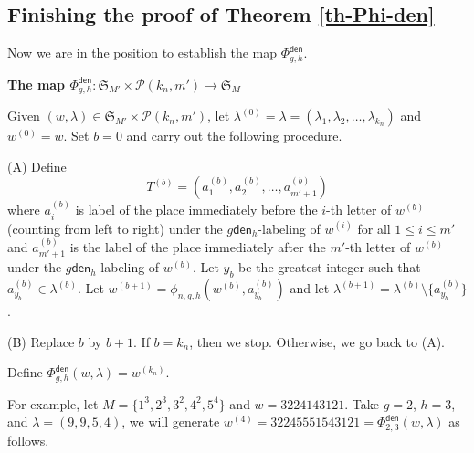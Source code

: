\documentclass[12pt]{article}
\numberwithin{equation}{section}
\theoremstyle{plain}
\def\den{\mathsf{den}}
\begin{document}
 
 
 \subsection{Finishing the proof of Theorem \ref{th-Phi-den}}
 Now we are in  the position to establish the map $\Phi^{\den}_{g,h}$. 
 
  
 
  \begin{framed}
 	\begin{center}
 		{\bf The map $\Phi^{\den}_{g,h}:\mathfrak{S}_{M'}\times \mathcal{P}(k_n, m') \longrightarrow \mathfrak{S}_{M}$ }
 	\end{center}
 	Given  $(w, \lambda)\in \mathfrak{S}_{M'}\times \mathcal{P}(k_n, m')  $, let $\lambda^{(0)}=\lambda=(\lambda_1, \lambda_2, \ldots, \lambda_{k_n})$ and  $w^{(0)}=w$. Set $b=0$ and carry out the following procedure. 
 	 	
 		(A) Define 
 		$$T^{(b)}=(a^{(b)}_{1}, a^{(b)}_2, \ldots,  a^{(b)}_{m'+1})$$ where $a^{(b)}_{i}$  is label of the place immediately before the $i$-th letter of $w^{(b)}$ (counting from left to right) under the $g\den_h$-labeling of $w^{(i)}$ for all $1\leq i\leq m'$ and  $a^{(b)}_{m'+1}$ is the label of the place immediately after   the $m'$-th letter    of $w^{(b)}$ under the $g\den_h$-labeling of $w^{(b)}$. 
Let $y_b$ be the greatest integer such that $a^{(b)}_{y_b}\in \lambda^{(b)}$. 
 	Let $w^{(b+1)}=\phi_{n,g,h}(w^{(b)}, a^{(b)}_{y_b})$ and let $\lambda^{(b+1)}=\lambda^{(b)}\setminus \{a^{(b)}_{y_b}\}$.  
 	
 	(B)  Replace $b$ by $b+1$. If $b=k_n$, then we stop. Otherwise, we go back to (A). 
 	
 	Define $\Phi^{\den}_{g,h}(w, \lambda)=w^{(k_n)}$. 
 	
 	
 \end{framed}
 
 
 
 For example, let $M=\{1^3, 2^3, 3^2, 4^2, 5^4\}$ and $w=3224143121$. Take $g=2$, $h=3$, and $\lambda=(9,9,5,4)$, we will generate $w^{(4)}=32245551543121=\Phi^{\den}_{2,3}(w, \lambda)$ as follows.
  	
\end{document}
